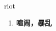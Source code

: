
\begin{frame}
{\huge riot}
\begin{center}
\begin{enumerate}\Large
  \item \textbf{喧闹，暴乱}
\end{enumerate}
\end{center}
\end{frame}
